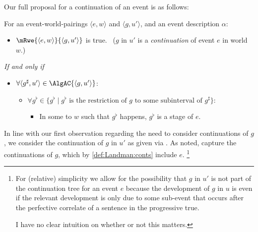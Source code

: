 \begin{note}
  Our full proposal for a  continuation of an event is as follows:
  \begin{definition}
    \label{def:myRwe}
    For an event-world-pairings \(\langle e,w \rangle\) and \(\langle g,u' \rangle\), and an event description \(\alpha\):
    \begin{itemize}
    \item
      \(\mRwe{\langle e,w \rangle}{\langle g,u' \rangle}\) is true.\newline
      \mbox{ }\hfill (\(g\) in \(u'\) is a \emph{ continuation} of event \(e\) in world \(w\).)
    \end{itemize}

    \emph{If and only if}

    \begin{itemize}
    \item
      \(\forall \langle g^{\sharp},u' \rangle \in \AlgAC{\langle g,u' \rangle}\):
      \begin{itemize}
      \item
        \(\forall g^{\flat} \in \{ g^{\flat} \mid g^{\flat} \text{ is the restriction of }g\text{ to some subinterval of }g^{\sharp} \}\):
      \begin{itemize}
      \item
        In some  to \(w\) such that \(g^{\flat}\) happens, \(g^{\flat}\) is a stage of \(e\).
      \end{itemize}
    \end{itemize}
  \end{itemize}
  \vspace{-\baselineskip}
  \end{definition}

  In line with our first observation regarding the need to consider continuations of \(g\), we consider the continuation of \(g\) in \(u'\) as given via \AlgAC{}.
  As noted, \AlgAC{} capture the continuations of \(g\), which by \autoref{def:Landman:conts} include \(e\).%
  \footnote{
    For (relative) simplicity we allow for the possibility that \(g\) in \(u'\) is not part of the continuation tree for an event \(e\) because the development of \(g\) in \(u\) is  even if the relevant development is only  due to some sub-event that occurs after the perfective correlate of a sentence in the progressive true.

    I have no clear intuition on whether or not this matters.

}
\end{note}
